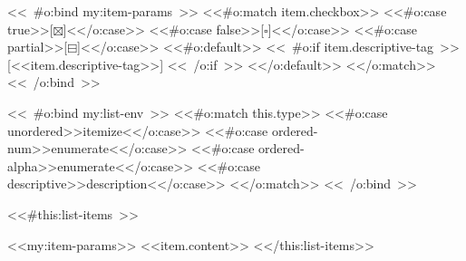 <<~#o:bind my:item-params~>>
  <<#o:match item.checkbox>>
    <<#o:case true>>[{$\boxtimes$}]<</o:case>>
    <<#o:case false>>[{$\square$}]<</o:case>>
    <<#o:case partial>>[{$\boxminus$}]<</o:case>>
    <<#o:default>>
      <<~#o:if item.descriptive-tag~>>
        [{<<item.descriptive-tag>>}]
      <<~/o:if~>>
    <</o:default>>
  <</o:match>>
<<~/o:bind~>>

<<~#o:bind my:list-env~>>
  <<#o:match this.type>>
    <<#o:case unordered>>itemize<</o:case>>
    <<#o:case ordered-num>>enumerate<</o:case>>
    <<#o:case ordered-alpha>>enumerate<</o:case>>
    <<#o:case descriptive>>description<</o:case>>
  <</o:match>>
<<~/o:bind~>>

\begin{<<my:list-env>>}
  <<#this:list-items~>>
    \item<<my:item-params>> <<item.content>>
  <</this:list-items>>
\end{<<my:list-env>>}
